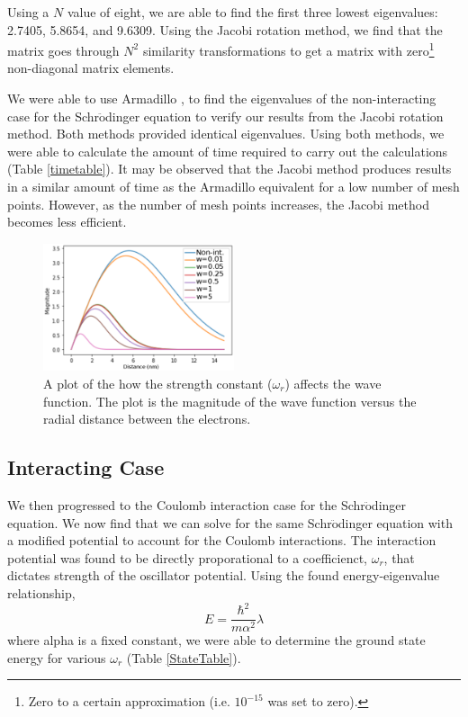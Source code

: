 \documentclass[%
reprint,
superscriptaddress,
showpacs,
nofootinbib,
bibnotes,amsmath,amssymb,aps,
prc, 
]{revtex4-1}
\begin{document}
	Using a $N$ value of eight, we are able to find the first three lowest eigenvalues: 2.7405, 5.8654, and 9.6309.  Using the Jacobi rotation method, we find that the matrix goes through $N^{2}$ similarity transformations to get a matrix with zero\footnote{Zero to a certain approximation (i.e. $10^{-15}$ was set to zero).} non-diagonal matrix elements.


	We were able to use Armadillo \cite{Armadillo}, to find the eigenvalues of the non-interacting case for the Schr$\ddot{\textrm{o}}$dinger equation to verify our results from the Jacobi rotation method. Both methods provided identical eigenvalues.  Using both methods, we were able to calculate the amount of time required to carry out the calculations (Table \ref{timetable}).  It may be observed that the Jacobi method produces results in a similar amount of time as the Armadillo equivalent for a low number of mesh points.  However, as the number of mesh points increases, the Jacobi method becomes less efficient.
	
		
\begin{figure}
	\centering
	\includegraphics[width=0.5\textwidth]{Graph.eps}
	\caption{A plot of the how the strength constant ($\omega_{r}$) affects the wave function.  The plot is the magnitude of the wave function versus the radial distance between the electrons. }
	\label{fig:graph}
\end{figure}

	
	\subsection{Interacting Case}
	
	We then progressed to the Coulomb interaction case for the Schr$\ddot{\textrm{o}}$dinger equation.  We now find that we can solve for the same Schr$\ddot{\textrm{o}}$dinger equation with a modified potential to account for the Coulomb interactions.  The interaction potential was found to be directly proporational to a coefficienct, $\omega_{r}$, that dictates strength of the oscillator potential.  Using the found energy-eigenvalue relationship, \begin{equation}
	E=\frac{\hbar^{2}}{m\alpha^{2}}\lambda
	\end{equation} where alpha is a fixed constant, we were able to determine the ground state energy for various $\omega_{r}$ (Table \ref{StateTable}).
	
\end{document}
